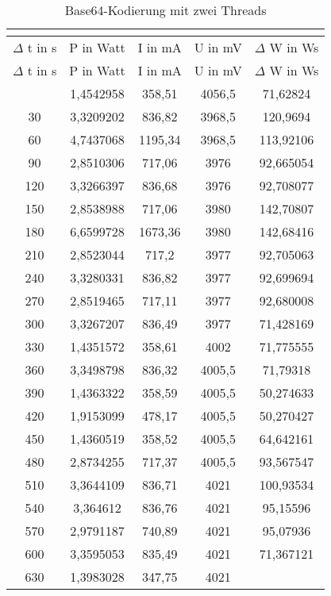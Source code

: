 
\begin{longtable}[c]{ccccc}
\caption{Base64-Kodierung mit zwei Threads} \\
\label{tab:Base64MessungThreadZwei}\\
\hline
{$\Delta$ t in s} & {P in Watt} & {I in mA} & {U in mV} & {$\Delta$ W in Ws} \\
\hline
\endfirsthead
\hline
$\Delta$ t in s & P in Watt & I in mA & U in mV & $\Delta$ W in Ws \\
\hline
\endhead
\hline
\endfoot
\hline
        \midrule
    0     & 1,4542958 & 358,51 & 4056,5 & 71,62824 \\
    \midrule
    30    & 3,3209202 & 836,82 & 3968,5 & 120,9694 \\
    \midrule
    60    & 4,7437068 & 1195,34 & 3968,5 & 113,92106 \\
    \midrule
    90    & 2,8510306 & 717,06 & 3976  & 92,665054 \\
    \midrule
    120   & 3,3266397 & 836,68 & 3976  & 92,708077 \\
    \midrule
    150   & 2,8538988 & 717,06 & 3980  & 142,70807 \\
    \midrule
    180   & 6,6599728 & 1673,36 & 3980  & 142,68416 \\
    \midrule
    210   & 2,8523044 & 717,2 & 3977  & 92,705063 \\
    \midrule
    240   & 3,3280331 & 836,82 & 3977  & 92,699694 \\
    \midrule
    270   & 2,8519465 & 717,11 & 3977  & 92,680008 \\
    \midrule
    300   & 3,3267207 & 836,49 & 3977  & 71,428169 \\
    \midrule
    330   & 1,4351572 & 358,61 & 4002  & 71,775555 \\
    \midrule
    360   & 3,3498798 & 836,32 & 4005,5 & 71,79318 \\
    \midrule
    390   & 1,4363322 & 358,59 & 4005,5 & 50,274633 \\
    \midrule
    420   & 1,9153099 & 478,17 & 4005,5 & 50,270427 \\
    \midrule
    450   & 1,4360519 & 358,52 & 4005,5 & 64,642161 \\
    \midrule
    480   & 2,8734255 & 717,37 & 4005,5 & 93,567547 \\
    \midrule
    510   & 3,3644109 & 836,71 & 4021  & 100,93534 \\
    \midrule
    540   & 3,364612 & 836,76 & 4021  & 95,15596 \\
    \midrule
    570   & 2,9791187 & 740,89 & 4021  & 95,07936 \\
    \midrule
    600   & 3,3595053 & 835,49 & 4021  & 71,367121 \\
    \midrule
    630   & 1,3983028 & 347,75 & 4021  &  \\
\end{longtable}